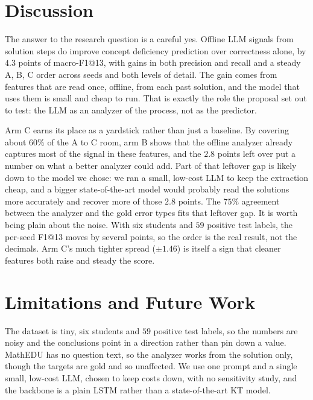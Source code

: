 \documentclass[11pt]{article}
\begin{document}
\section{Discussion}
The answer to the research question is a careful yes. Offline LLM signals from solution
steps do improve concept deficiency prediction over correctness alone, by $4.3$ points
of macro-F1@13, with gains in both precision and recall and a steady A, B, C order
across seeds and both levels of detail. The gain comes from features that are read once,
offline, from each past solution, and the model that uses them is small and cheap to
run. That is exactly the role the proposal set out to test: the LLM as an analyzer of the
process, not as the predictor.

Arm C earns its place as a yardstick rather than just a baseline. By covering about
$60\%$ of the A to C room, arm B shows that the offline analyzer already captures most of
the signal in these features, and the $2.8$ points left over put a number on what a
better analyzer could add. Part of that leftover gap is likely down to the model we
chose: we ran a small, low-cost LLM to keep the extraction cheap, and a bigger
state-of-the-art model would probably read the solutions more accurately and recover more
of those $2.8$ points. The $75\%$ agreement between the analyzer and the gold error
types fits that leftover gap. It is worth being plain about the noise. With six students
and $59$ positive test labels, the per-seed F1@13 moves by several points, so the order
is the real result, not the decimals. Arm C's much tighter spread ($\pm1.46$) is itself
a sign that cleaner features both raise and steady the score.

\section{Limitations and Future Work}
The dataset is tiny, six students and $59$ positive test labels, so the numbers are
noisy and the conclusions point in a direction rather than pin down a value. MathEDU has
no question text, so the analyzer works from the solution only, though the targets are
gold and so unaffected. We use one prompt and a single small, low-cost LLM, chosen to keep costs down, with no
sensitivity study, and the backbone is a plain LSTM rather than a state-of-the-art KT
model.
\end{document}
